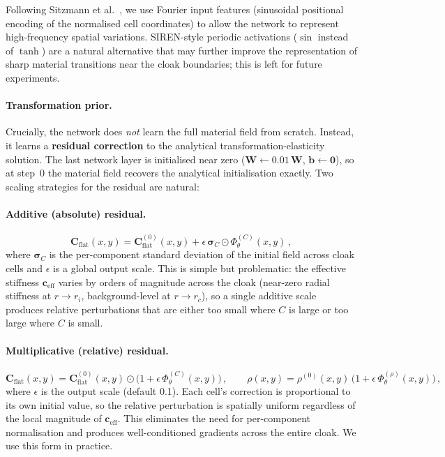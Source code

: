 \documentclass{article}
\newcommand{\mbf}[1]{\mathbf{#1}}
\newcommand{\be}{\begin{equation}}
\newcommand{\ee}{\end{equation}}
\begin{document}
Following Sitzmann et al.~\cite{sitzmann2020siren}, we use Fourier
input features (sinusoidal positional encoding of the normalised cell
coordinates) to allow the network to represent high-frequency spatial
variations.
SIREN-style periodic activations ($\sin$ instead of $\tanh$) are a
natural alternative that may further improve the representation of
sharp material transitions near the cloak boundaries; this is left
for future experiments.

\paragraph{Transformation prior.}
Crucially, the network does \emph{not} learn the full material field
from scratch.  Instead, it learns a \textbf{residual correction} to the
analytical transformation-elasticity solution.
The last network layer is initialised near zero
($\mbf{W} \leftarrow 0.01\,\mbf{W}$, $\mbf{b} \leftarrow \mbf{0}$),
so at step~0 the material field recovers the analytical initialisation
exactly. Two scaling strategies for the residual are natural:

\medskip\noindent
\paragraph{Additive (absolute) residual.}
\be\label{eq:neural_additive}
  \mbf{C}_{\mathrm{flat}}(x,y)
  = \mbf{C}_{\mathrm{flat}}^{(0)}(x,y)
    + \epsilon\,\boldsymbol{\sigma}_C \odot \Phi_\theta^{(C)}(x,y)\,,
\ee
where $\boldsymbol{\sigma}_C$ is the per-component standard deviation
of the initial field across cloak cells and $\epsilon$ is a global
output scale.
This is simple but problematic: the effective stiffness
$\mbf{c}_{\mathrm{eff}}$ varies by orders of magnitude across the
cloak (near-zero radial stiffness at $r \to r_i$, background-level
at $r \to r_c$), so a single additive scale produces relative
perturbations that are either too small where $C$ is large or too
large where $C$ is small.

\medskip\noindent
\paragraph{Multiplicative (relative) residual.}
\be\label{eq:neural_relative}
  \mbf{C}_{\mathrm{flat}}(x,y)
  = \mbf{C}_{\mathrm{flat}}^{(0)}(x,y)
    \odot \bigl(1 + \epsilon\,\Phi_\theta^{(C)}(x,y)\bigr)\,,
  \qquad
  \rho(x,y)
  = \rho^{(0)}(x,y)
    \,\bigl(1 + \epsilon\,\Phi_\theta^{(\rho)}(x,y)\bigr)\,,
\ee
where $\epsilon$ is the output scale (default 0.1).
Each cell's correction is proportional to its own initial value,
so the relative perturbation is spatially uniform regardless of the
local magnitude of $\mbf{c}_{\mathrm{eff}}$.
This eliminates the need for per-component normalisation and produces
well-conditioned gradients across the entire cloak.
We use this form in practice.
\end{document}
